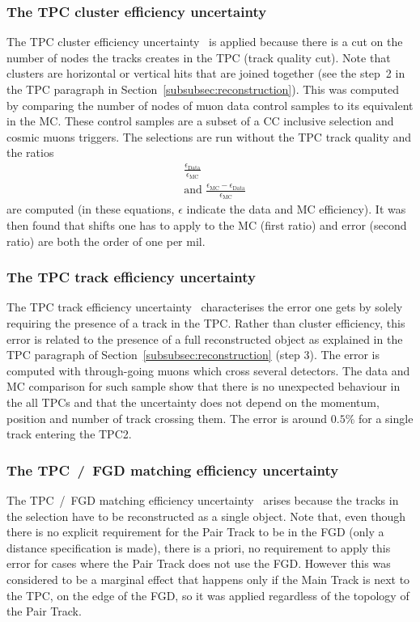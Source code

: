 \subsubsection{The \Gls{TPC} cluster efficiency uncertainty}
\label{subsec:tpccluster}
The \Gls{TPC} cluster efficiency uncertainty~\cite{TN212} is applied
because there is a cut on the number of nodes the tracks creates in
the \Gls{TPC} (track quality cut). Note that clusters are horizontal
or vertical hits that are joined together (see the step~2 in the
\Gls{TPC} paragraph in Section~\ref{subsubsec:reconstruction}). This
was computed by comparing the number of nodes of muon data control
samples to its equivalent in the \Gls{MC}. These control samples are a
subset of a \Gls{CC} inclusive selection and cosmic muons
triggers. The selections are run without the \Gls{TPC} track quality
and the ratios
\begin{align}
  &\frac{\epsilon_\text{Data}}{\epsilon_\text{MC}} \label{eq:effcorrection}\\
  &\text{and~}\frac{\epsilon_{\text{MC}}-\epsilon_{\text{Data}}}{\epsilon_{\text{MC}}}\label{eq:efferror}
\end{align}
are computed (in these equations, $\epsilon$ indicate the data and
\Gls{MC} efficiency). It was then found that shifts one has to apply
to the \Gls{MC} (first ratio) and error (second ratio) are both the
order of one per mil.

\subsubsection{The \Gls{TPC} track efficiency uncertainty}
\label{subsubsec:tpctrack}
The \Gls{TPC} track efficiency uncertainty~\cite{TN212} characterises
the error one gets by solely requiring the presence of a track in the
\Gls{TPC}. Rather than cluster efficiency, this error is related to
the presence of a full reconstructed object as explained in the
\Gls{TPC} paragraph of Section~\ref{subsubsec:reconstruction} (step
3). The error is computed with through-going muons which cross several
detectors. The data and \Gls{MC} comparison for such sample show that
there is no unexpected behaviour in the all \Glspl{TPC} and that the
uncertainty does not depend on the momentum, position and number of
track crossing them. The error is around $0.5\%$ for a single track
entering the \Gls{TPC}2.

\subsubsection{The \Gls{TPC}~/~\Gls{FGD} matching efficiency uncertainty}
\label{subsubsec:tpcfgdmatch}
The \Gls{TPC}~/~\Gls{FGD} matching efficiency uncertainty~\cite{TN212}
arises because the tracks in the selection have to be reconstructed as
a single object. Note that, even though there is no explicit
requirement for the Pair Track to be in the \Gls{FGD} (only a distance
specification is made), there is a priori, no requirement to apply
this error for cases where the Pair Track does not use the
\Gls{FGD}. However this was considered to be a marginal effect that
happens only if the Main Track is next to the \Gls{TPC}, on the edge
of the \Gls{FGD}, so it was applied regardless of the topology of the
Pair Track.

